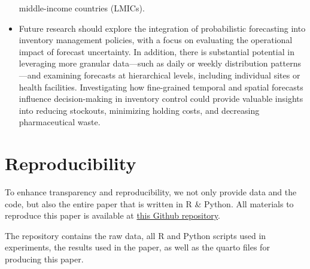 \documentclass[
  authoryear,
  preprint,
  3p]{elsarticle}
\begin{document}
\begin{itemize}
  middle-income countries (LMICs).
\item
  Future research should explore the integration of probabilistic
  forecasting into inventory management policies, with a focus on
  evaluating the operational impact of forecast uncertainty. In
  addition, there is substantial potential in leveraging more granular
  data---such as daily or weekly distribution patterns---and examining
  forecasts at hierarchical levels, including individual sites or health
  facilities. Investigating how fine-grained temporal and spatial
  forecasts influence decision-making in inventory control could provide
  valuable insights into reducing stockouts, minimizing holding costs,
  and decreasing pharmaceutical waste.
\end{itemize}

\section*{Reproducibility}\label{reproducibility}

To enhance transparency and reproducibility, we not only provide data
and the code, but also the entire paper that is written in R \& Python.
All materials to reproduce this paper is available at
\href{https://github.com/arebuissa/Forecasting_EPSS_domain_knowledge}{this
Github repository}.

The repository contains the raw data, all R and Python scripts used in
experiments, the results used in the paper, as well as the quarto files
for producing this paper.


\renewcommand\refname{References}
  
\end{document}

